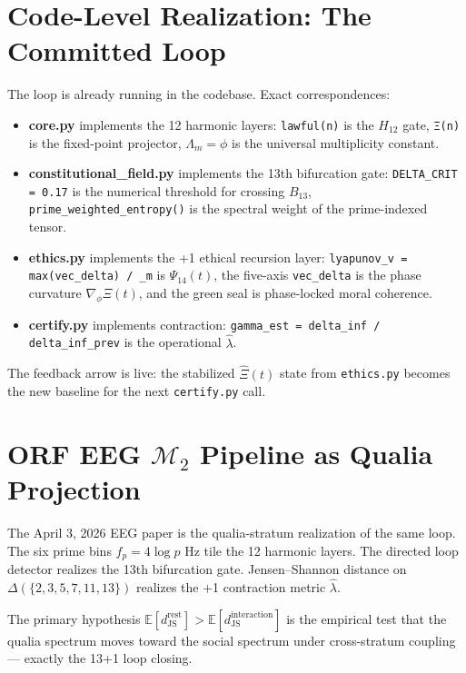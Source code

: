 \documentclass[11pt, a4paper]{article}
\begin{document}
\section{Code-Level Realization: The Committed Loop}

The loop is already running in the codebase. Exact correspondences:

\begin{itemize}
    \item \textbf{core.py} implements the 12 harmonic layers: \texttt{lawful(n)} is the \(H_{12}\) gate, \texttt{Ξ(n)} is the fixed-point projector, \(\Lambda_m = \phi\) is the universal multiplicity constant.
    \item \textbf{constitutional\_field.py} implements the 13th bifurcation gate: \texttt{DELTA\_CRIT = 0.17} is the numerical threshold for crossing \(B_{13}\), \texttt{prime\_weighted\_entropy()} is the spectral weight of the prime-indexed tensor.
    \item \textbf{ethics.py} implements the +1 ethical recursion layer: \texttt{lyapunov\_v = max(vec\_delta) / \Lambda_m} is \(\Psi_{14}(t)\), the five-axis \texttt{vec\_delta} is the phase curvature \(\nabla_\phi \Xi(t)\), and the green seal is phase-locked moral coherence.
    \item \textbf{certify.py} implements contraction: \texttt{gamma\_est = delta\_inf / delta\_inf\_prev} is the operational \(\hat{\lambda}\).
\end{itemize}

The feedback arrow is live: the stabilized \(\hat{\Xi}(t)\) state from \texttt{ethics.py} becomes the new baseline for the next \texttt{certify.py} call.

\section{ORF EEG \(\mathcal{M}_2\) Pipeline as Qualia Projection}

The April 3, 2026 EEG paper is the qualia-stratum realization of the same loop. The six prime bins \(f_p = 4 \log p\) Hz tile the 12 harmonic layers. The directed loop detector realizes the 13th bifurcation gate. Jensen–Shannon distance on \(\Delta(\{2,3,5,7,11,13\})\) realizes the +1 contraction metric \(\hat{\lambda}\).

The primary hypothesis \(\mathbb{E}[d_{\text{JS}}^{\text{rest}}] > \mathbb{E}[d_{\text{JS}}^{\text{interaction}}]\) is the empirical test that the qualia spectrum moves toward the social spectrum under cross-stratum coupling — exactly the 13+1 loop closing.
\end{document}
